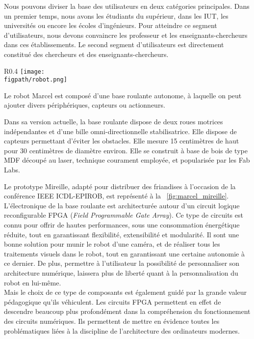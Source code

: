 \documentclass[a4paper,12pt]{report}
\newcommand{\figpath}{figures}
\begin{document}
Nous pouvons diviser la base des utilisateurs en deux catégories principales.
Dans un premier temps, nous avons les étudiants du supérieur, dans les IUT, les universités ou encore les écoles d'ingénieurs.
Pour atteindre ce segment d'utilisateurs, nous devons convaincre les professeur et les enseignants-chercheurs dans ces établissements.
Le second segment d'utilisateurs est directement constitué des chercheurs et des enseignants-chercheurs.\\

%

\begin{wrapfigure}{R}{0.4\textwidth}
	\centering
	\texttt{[image: \\figpath/robot.png]}
	\caption{\label{fig:marcel_mireille}Base roulante Marcel : Prototype \og{}Mireille\fg{}.}
\end{wrapfigure}

Le robot Marcel est composé d'une base roulante autonome, à laquelle on peut ajouter divers périphériques, capteurs ou actionneurs.

Dans sa version actuelle, la base roulante dispose de deux roues motrices indépendantes et d'une bille omni-directionnelle stabilisatrice.
Elle dispose de capteurs permettant d'éviter les obstacles.
Elle mesure 15 centimètres de haut pour 30 centimètres de diamètre environ.
Elle se construit à base de bois de type MDF découpé au laser, technique courament employée, et popularisée par les Fab Labs.

Le prototype \og{}Mireille\fg{}, adapté pour distribuer des friandises à l'occasion de la conférence IEEE ICDL-EPIROB, est représenté à la \figurename~\ref{fig:marcel_mireille}.\\

L'électronique de la base roulante est architecturée autour d'un circuit logique reconfigurable FPGA (\emph{Field Programmable Gate Array}).
Ce type de circuits est connu pour offrir de hautes performances, sous une consommation énergétique réduite, tout en garantissant flexibilité, extensibilité et modularité.
Il sont une bonne solution pour munir le robot d'une caméra, et de réaliser tous les traitements visuels dans le robot, tout en garantissant une certaine autonomie à ce dernier.
De plus, permettre à l'utilisateur la possibilité de personnaliser son architecture numérique, laissera plus de liberté quant à la personnalisation du robot en lui-même.\\

Mais le choix de ce type de composants est également guidé par la grande valeur pédagogique qu'ils véhiculent.
Les circuits FPGA permettent en effet de descendre beaucoup plus profondément dans la compréhension du fonctionnement des circuits numériques.
Ils permettent de mettre en évidence toutes les problématiques liées à la discipline de l'architecture des ordinateurs modernes.
\end{document}
